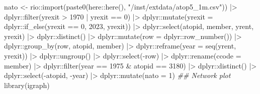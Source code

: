 \documentclass[
  12,
  letterpaper,
  DIV=11,
  numbers=noendperiod]{scrartcl}
\newenvironment{Shaded}{\begin{snugshade}}{\end{snugshade}}
\newcommand{\AttributeTok}[1]{\textcolor[rgb]{0.40,0.45,0.13}{#1}}
\newcommand{\DecValTok}[1]{\textcolor[rgb]{0.68,0.00,0.00}{#1}}
\newcommand{\DocumentationTok}[1]{\textcolor[rgb]{0.37,0.37,0.37}{\textit{#1}}}
\newcommand{\FunctionTok}[1]{\textcolor[rgb]{0.28,0.35,0.67}{#1}}
\newcommand{\NormalTok}[1]{\textcolor[rgb]{0.00,0.23,0.31}{#1}}
\newcommand{\OtherTok}[1]{\textcolor[rgb]{0.00,0.23,0.31}{#1}}
\newcommand{\SpecialCharTok}[1]{\textcolor[rgb]{0.37,0.37,0.37}{#1}}
\newcommand{\StringTok}[1]{\textcolor[rgb]{0.13,0.47,0.30}{#1}}
\begin{document}
\begin{Shaded}
\begin{Highlighting}[numbers=left,,]
\NormalTok{nato }\OtherTok{\textless{}{-}}\NormalTok{ rio}\SpecialCharTok{::}\FunctionTok{import}\NormalTok{(}\FunctionTok{paste0}\NormalTok{(here}\SpecialCharTok{::}\FunctionTok{here}\NormalTok{(), }\StringTok{"/inst/extdata/atop5\_1m.csv"}\NormalTok{)) }\SpecialCharTok{|\textgreater{}}
\NormalTok{  dplyr}\SpecialCharTok{::}\FunctionTok{filter}\NormalTok{(yrexit }\SpecialCharTok{\textgreater{}} \DecValTok{1970} \SpecialCharTok{|}
\NormalTok{                  yrexit }\SpecialCharTok{==} \DecValTok{0}\NormalTok{) }\SpecialCharTok{|\textgreater{}}
\NormalTok{  dplyr}\SpecialCharTok{::}\FunctionTok{mutate}\NormalTok{(}\AttributeTok{yrexit =}\NormalTok{ dplyr}\SpecialCharTok{::}\FunctionTok{if\_else}\NormalTok{(yrexit }\SpecialCharTok{==} \DecValTok{0}\NormalTok{,}
                                        \DecValTok{2023}\NormalTok{,}
\NormalTok{                                        yrexit)) }\SpecialCharTok{|\textgreater{}}
\NormalTok{  dplyr}\SpecialCharTok{::}\FunctionTok{select}\NormalTok{(atopid, member, yrent, yrexit) }\SpecialCharTok{|\textgreater{}}
\NormalTok{  dplyr}\SpecialCharTok{::}\FunctionTok{distinct}\NormalTok{() }\SpecialCharTok{|\textgreater{}}
\NormalTok{  dplyr}\SpecialCharTok{::}\FunctionTok{mutate}\NormalTok{(}\AttributeTok{row =}\NormalTok{ dplyr}\SpecialCharTok{::}\FunctionTok{row\_number}\NormalTok{()) }\SpecialCharTok{|\textgreater{}}
\NormalTok{  dplyr}\SpecialCharTok{::}\FunctionTok{group\_by}\NormalTok{(row, atopid, member) }\SpecialCharTok{|\textgreater{}}
\NormalTok{  dplyr}\SpecialCharTok{::}\FunctionTok{reframe}\NormalTok{(}\AttributeTok{year =} \FunctionTok{seq}\NormalTok{(yrent, yrexit)) }\SpecialCharTok{|\textgreater{}}
\NormalTok{  dplyr}\SpecialCharTok{::}\FunctionTok{ungroup}\NormalTok{() }\SpecialCharTok{|\textgreater{}}
\NormalTok{  dplyr}\SpecialCharTok{::}\FunctionTok{select}\NormalTok{(}\SpecialCharTok{{-}}\NormalTok{row) }\SpecialCharTok{|\textgreater{}}
\NormalTok{  dplyr}\SpecialCharTok{::}\FunctionTok{rename}\NormalTok{(}\AttributeTok{ccode =} \StringTok{\textquotesingle{}member\textquotesingle{}}\NormalTok{) }\SpecialCharTok{|\textgreater{}}
\NormalTok{  dplyr}\SpecialCharTok{::}\FunctionTok{filter}\NormalTok{(year }\SpecialCharTok{==} \DecValTok{1975} \SpecialCharTok{\&}\NormalTok{ atopid }\SpecialCharTok{==} \DecValTok{3180}\NormalTok{) }\SpecialCharTok{|\textgreater{}}
\NormalTok{  dplyr}\SpecialCharTok{::}\FunctionTok{distinct}\NormalTok{() }\SpecialCharTok{|\textgreater{}}
\NormalTok{  dplyr}\SpecialCharTok{::}\FunctionTok{select}\NormalTok{(}\SpecialCharTok{{-}}\NormalTok{atopid, }\SpecialCharTok{{-}}\NormalTok{year) }\SpecialCharTok{|\textgreater{}}
\NormalTok{  dplyr}\SpecialCharTok{::}\FunctionTok{mutate}\NormalTok{(}\AttributeTok{nato =} \DecValTok{1}\NormalTok{)}
\DocumentationTok{\#\# Network plot}
\FunctionTok{library}\NormalTok{(igraph)}
\end{Highlighting}
\end{Shaded}
\end{document}
